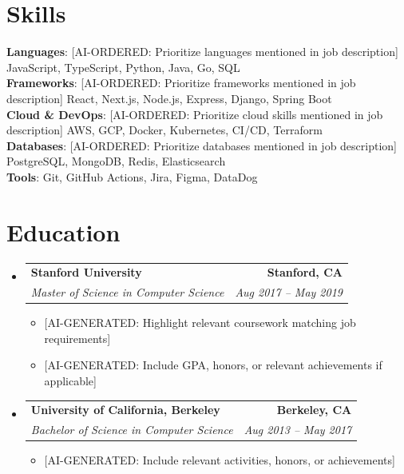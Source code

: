 \documentclass[letterpaper,11pt]{article}
\makeatletter
\newcommand{\resumeItem}[1]{
  \item\small{
    {#1 \vspace{-2pt}}
  }
}
\newcommand{\resumeSubheading}[4]{
  \vspace{-2pt}\item
    \begin{tabular*}{1.0\textwidth}[t]{l@{\extracolsep{\fill}}r}
      \textbf{#1} & \textbf{\small #2} \\
      \textit{\small#3} & \textit{\small #4} \\
    \end{tabular*}\vspace{-7pt}
}
\newcommand{\resumeSubHeadingListStart}{\begin{itemize}[leftmargin=0.0in, label={}]}
\newcommand{\resumeSubHeadingListEnd}{\end{itemize}}
\newcommand{\resumeItemListStart}{\begin{itemize}}
\newcommand{\resumeItemListEnd}{\end{itemize}\vspace{-5pt}}
\makeatother
\begin{document}
\section{Skills}
 \begin{itemize}[leftmargin=0.15in, label={}]
    \small{\item{
     \textbf{Languages}{: [AI-ORDERED: Prioritize languages mentioned in job description] JavaScript, TypeScript, Python, Java, Go, SQL} \\
     \textbf{Frameworks}{: [AI-ORDERED: Prioritize frameworks mentioned in job description] React, Next.js, Node.js, Express, Django, Spring Boot} \\
     \textbf{Cloud \& DevOps}{: [AI-ORDERED: Prioritize cloud skills mentioned in job description] AWS, GCP, Docker, Kubernetes, CI/CD, Terraform} \\
     \textbf{Databases}{: [AI-ORDERED: Prioritize databases mentioned in job description] PostgreSQL, MongoDB, Redis, Elasticsearch} \\
     \textbf{Tools}{: Git, GitHub Actions, Jira, Figma, DataDog}
    }}
 \end{itemize}

\section{Education}
  \resumeSubHeadingListStart
    \resumeSubheading
      {Stanford University}{Stanford, CA}
      {Master of Science in Computer Science}{Aug 2017 -- May 2019}
      \resumeItemListStart
        \resumeItem{[AI-GENERATED: Highlight relevant coursework matching job requirements]}
        \resumeItem{[AI-GENERATED: Include GPA, honors, or relevant achievements if applicable]}
      \resumeItemListEnd
      
    \resumeSubheading
      {University of California, Berkeley}{Berkeley, CA}
      {Bachelor of Science in Computer Science}{Aug 2013 -- May 2017}
      \resumeItemListStart
        \resumeItem{[AI-GENERATED: Include relevant activities, honors, or achievements]}
      \resumeItemListEnd
  \resumeSubHeadingListEnd

\end{document}
